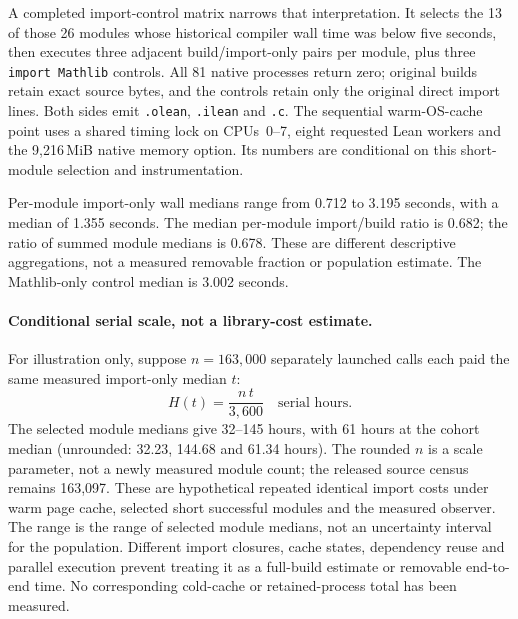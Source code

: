 \documentclass[10pt,twocolumn]{article}
\begin{document}
A completed import-control matrix narrows that interpretation.
It selects the 13 of those 26 modules whose historical compiler wall time
was below five seconds, then executes three adjacent build/import-only
pairs per module, plus three \texttt{import Mathlib} controls.
All 81 native processes return zero; original builds retain exact source
bytes, and the controls retain only the original direct import lines.
Both sides emit \texttt{.olean}, \texttt{.ilean} and \texttt{.c}.
The sequential warm-OS-cache point uses a shared timing lock on CPUs~0--7,
eight requested Lean workers and the 9,216\,MiB native memory option.
Its numbers are conditional on this short-module selection and instrumentation.

Per-module import-only wall medians range from 0.712 to 3.195 seconds,
with a median of 1.355 seconds. The median per-module import/build ratio
is 0.682; the ratio of summed module medians is 0.678.
These are different descriptive aggregations, not a measured removable
fraction or population estimate. The Mathlib-only control median is
3.002 seconds.

\paragraph{Conditional serial scale, not a library-cost estimate.}
For illustration only, suppose $n=163{,}000$ separately launched calls
each paid the same measured import-only median $t$:
\[
  H(t)=\frac{n\,t}{3{,}600}\quad\text{serial hours}.
\]
The selected module medians give 32--145 hours, with 61 hours at the
cohort median (unrounded: 32.23, 144.68 and 61.34 hours).
The rounded $n$ is a scale parameter, not a newly measured module count;
the released source census remains 163,097.
These are hypothetical repeated identical import costs under warm page
cache, selected short successful modules and the measured observer.
The range is the range of selected module medians, not an uncertainty
interval for the population.
Different import closures, cache states, dependency reuse and parallel
execution prevent treating it as a full-build estimate or removable
end-to-end time. No corresponding cold-cache or retained-process total
has been measured.
\end{document}

